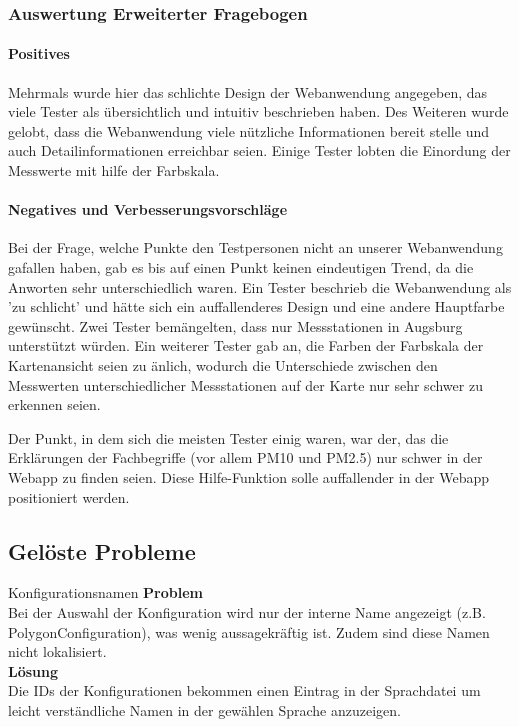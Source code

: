     \subsubsection{Auswertung Erweiterter Fragebogen}
      \paragraph{Positives}
        Mehrmals wurde hier das schlichte Design der Webanwendung angegeben, das viele Tester als übersichtlich und intuitiv beschrieben haben.
        Des Weiteren wurde gelobt, dass die Webanwendung viele nützliche Informationen bereit stelle und auch Detailinformationen erreichbar seien.
        Einige Tester lobten die Einordung der Messwerte mit hilfe der Farbskala.
     
      \paragraph{Negatives und Verbesserungsvorschläge}
        Bei der Frage, welche Punkte den Testpersonen nicht an unserer Webanwendung gafallen haben, gab es bis auf einen Punkt keinen eindeutigen Trend, da die Anworten sehr unterschiedlich waren.
        Ein Tester beschrieb die Webanwendung als 'zu schlicht' und hätte sich ein auffallenderes Design und eine andere Hauptfarbe gewünscht.
        Zwei Tester bemängelten, dass nur Messstationen in Augsburg unterstützt würden.
        Ein weiterer Tester gab an, die Farben der Farbskala der Kartenansicht seien zu änlich, wodurch die Unterschiede zwischen den Messwerten unterschiedlicher Messstationen auf der Karte nur sehr schwer zu erkennen seien.
        
        Der Punkt, in dem sich die meisten Tester einig waren, war der, das die Erklärungen der Fachbegriffe (vor allem PM10 und PM2.5) nur schwer in der Webapp zu finden seien. Diese Hilfe-Funktion solle auffallender in der Webapp positioniert werden.

  \subsection{Gelöste Probleme}

    \begin{Bug}{Konfigurationsnamen}
      \textbf{Problem}\\
      Bei der Auswahl der Konfiguration wird nur der interne Name angezeigt (z.B. PolygonConfiguration),
      was wenig aussagekräftig ist. Zudem sind diese Namen nicht lokalisiert.\\
      \linebreak
      \textbf{Lösung}\\
      Die IDs der Konfigurationen bekommen einen Eintrag in der Sprachdatei um leicht verständliche
      Namen in der gewählen Sprache anzuzeigen.\\
    \end{Bug}

